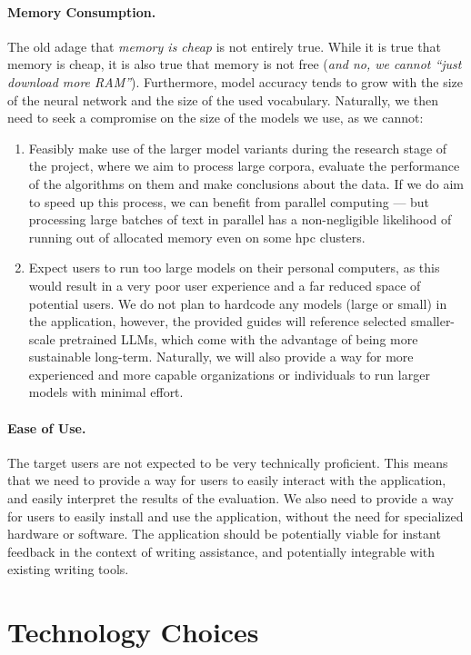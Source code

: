\paragraph{Memory Consumption.} The old adage that \textit{memory is cheap} is not entirely true. While it is true that memory is cheap, it is also true that memory is not free (\textit{and no, we cannot ``just download more RAM''}). Furthermore, model accuracy tends to grow with the size of the neural network and the size of the used vocabulary. Naturally, we then need to seek a compromise on the size of the models we use, as we cannot:
\begin{enumerate}
    \item Feasibly make use of the larger model variants during the research stage of the project, where we aim to process large corpora, evaluate the performance of the algorithms on them and make conclusions about the data. If we do aim to speed up this process, we can benefit from parallel computing --- but processing large batches of text in parallel has a non-negligible likelihood of running out of allocated memory even on some \acrfull{hpc} clusters.
    \item Expect users to run too large models on their personal computers, as this would result in a very poor user experience and a far reduced space of potential users. We do not plan to hardcode any models (large or small) in the application, however, the provided guides will reference selected smaller-scale pretrained LLMs, which come with the advantage of being more sustainable long-term. Naturally, we will also provide a way for more experienced and more capable organizations or individuals to run larger models with minimal effort. 
\end{enumerate} 

\paragraph{Ease of Use.} The target users are not expected to be very technically proficient. This means that we need to provide a way for users to easily interact with the application, and easily interpret the results of the evaluation. We also need to provide a way for users to easily install and use the application, without the need for specialized hardware or software. The application should be potentially viable for instant feedback in the context of writing assistance, and potentially integrable with existing writing tools.

\section{Technology Choices}
